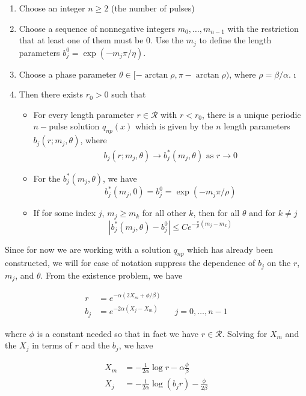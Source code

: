\documentclass[thesis.tex]{subfiles}
\begin{document}
\begin{enumerate}
	\item Choose an integer $n \geq 2$ (the number of pulses) 
	\item Choose a sequence of nonnegative integers $m_0, \dots, m_{n-1}$ with the restriction that at least one of them must be 0. Use the $m_j$ to define the length parameters $b_j^0 = \exp(-m_j \pi / \eta )$.
	\item Choose a phase parameter $\theta \in [-\arctan \rho, \pi - \arctan \rho)$, where $\rho = \beta / \alpha$.
	\i 
	\item Then there exists $r_0 > 0$ such that 
		\begin{itemize}
		\item For every length parameter $r \in \mathcal{R}$ with $r < r_0$, there is a unique periodic $n-$pulse solution $q_{np}(x)$ which is given by the $n$ length parameters $b_j(r; m_j, \theta)$, where
		\begin{align*}
		b_j(r; m_j, \theta) \rightarrow b^*_j(m_j, \theta) \text{ as }
		r \rightarrow 0
		\end{align*}
		\item For the $b^*_j(m_j, \theta)$, we have
		\[
		b^*_j(m_j, 0) = b_j^0 = \exp(-m_j \pi / \rho )
		\]
		\item If for some index $j$, $m_j \geq m_k$ for all other $k$, then for all $\theta$ and for $k \neq j$
		\[
		|b^*_j(m_j, \theta) - b_j^0| \leq C e^{ -\frac{\pi}{\rho} (m_j - m_k) }
		\]
		\end{itemize}
\end{enumerate} 

Since for now we are working with a solution $q_{np}$ which has already been constructed, we will for ease of notation suppress the dependence of $b_j$ on the $r$, $m_j$, and $\theta$. From the existence problem, we have

\begin{align}
r &= e^{-\alpha(2 X_m + \phi/\beta)} \\
b_j &= e^{-2 \alpha(X_j - X_m)} && j = 0, \dots, n-1
\end{align}

where $\phi$ is a constant needed so that in fact we have $r \in \mathcal{R}$.
Solving for $X_m$ and the $X_j$ in terms of $r$ and the $b_j$, we have

\begin{align*}
X_m &= -\frac{1}{2\alpha}\log r - \alpha \frac{\phi}{\beta} \\
X_j &= -\frac{1}{2\alpha}\log(b_j r) - \frac{\phi}{2 \beta} 
\end{align*}
\end{document}
